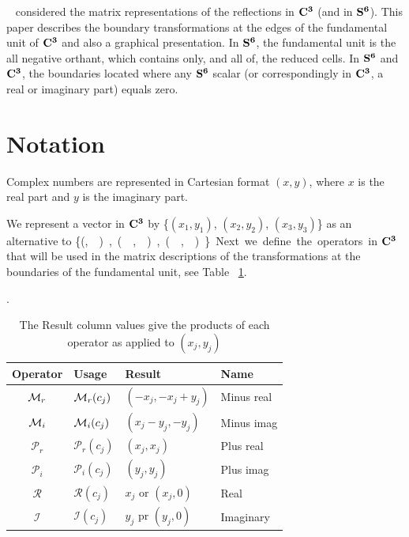 \documentclass[]{iucr}              %
\numberwithin{equation}{section}
\newcommand{\SVI}[0]{$\bf{S^{6}}$}
\newcommand{\CIII}[0]{$\bf{C^{3}}$}
\newcommand{\Imaginary}[0]{\mathcal{I}}
\newcommand{\Real}[0]{\mathcal{R}}
\begin{document}
	~ considered the matrix representations 
	of the reflections in \CIII{} (and in \SVI{}). 
	This paper describes the boundary transformations 
	at the edges of the fundamental	unit of \CIII{}
	and also a graphical presentation. 
	In \SVI{}, the fundamental unit is the all negative orthant, 
	which contains only, and all of, the reduced cells. 
	In \SVI{} and \CIII{}, 
	the boundaries located where any \SVI{} scalar 
	(or correspondingly in \CIII{}, a real or imaginary part) 
	equals zero. 
	
	
	
	
	\section{Notation}
	
	Complex numbers are represented 
	in Cartesian format $(x,y)$, 
	where $x$ is the real part and
	$y$ is the imaginary part.
	
	We represent a vector 
	in \CIII{} by \{$(x_1,y_1)$, $(x_2,y_2)$, $(x_3, y_3)$\} 
	as an alternative to  \{(\si,\siv ), (\sii,\sv),(\siii,\svi)\}.
	
	Next we define the operators in \CIII{} that 
	will be used in the matrix descriptions of 
	the transformations at the boundaries of the fundamental unit,
	see Table ~\ref{tab:operators}.
	
	\begin{table}	
		\label{tab:operators}
		\caption{The Result column values give the products of each operator as applied to $(x_j, y_j)$}.
		\begin{tabular}{c l l l }
			\toprule
			Operator			&Usage						&Result					&Name\\
			\midrule
			$\mathcal{M}{}_r $		&  $\mathcal{M}{}_r(c_j)$ 		& $(-x_j, -x_j+y_j)$ 	& Minus real \\ 
			$\mathcal{M}{}_i $ 		& $\mathcal{M}{}_i(c_j)$ 		& $(x_j-y_j,-y_j) $ 	& Minus imag\\ 
			$\mathcal{P}_r$ 	& $ \mathcal{P}_r(c_j)$ 	& $(x_j, x_j)$ 		& Plus real\\ 
			$\mathcal{P}_i$ 	&  $\mathcal{P}_i(c_j)$  	& $(y_j, y_j)$ 		& Plus imag\\ 
			$\Real$ 			&  $\Real(c_j)$ 			& $x_j$ or $(x_j,0)$		& Real \\ 
			$\Imaginary$ 		&  $\Imaginary(c_j)$ 		& $y_j$ pr $(y_j,0)$ 		& Imaginary\\
			\bottomrule
		\end{tabular}		
	\end{table}
	
\end{document}
